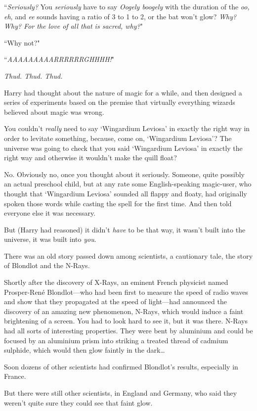 ``\emph{Seriously?} You \emph{seriously} have to say \emph{Oogely boogely} with the duration of the \emph{oo, eh}, and \emph{ee} sounds having a ratio of 3 to 1 to 2, or the bat won't glow? \emph{Why? Why? For the love of all that is sacred, why?}"

``Why not?"

``\emph{AAAAAAAAARRRRRRGHHHH!}"

\emph{Thud. Thud. Thud.}

Harry had thought about the nature of magic for a while, and then designed a series of experiments based on the premise that virtually everything wizards believed about magic was wrong.

You couldn't \emph{really} need to say `Wingardium Leviosa' in exactly the right way in order to levitate something, because, come on, `Wingardium Leviosa'? The universe was going to check that you said `Wingardium Leviosa' in exactly the right way and otherwise it wouldn't make the quill float?

No. Obviously no, once you thought about it seriously. Someone, quite possibly an actual preschool child, but at any rate some English-speaking magic-user, who thought that `Wingardium Leviosa' sounded all flappy and floaty, had originally spoken those words while casting the spell for the first time. And then told everyone else it was necessary.

But (Harry had reasoned) it didn't \emph{have} to be that way, it wasn't built into the universe, it was built into \emph{you}.

There was an old story passed down among scientists, a cautionary tale, the story of Blondlot and the N-Rays.

Shortly after the discovery of X-Rays, an eminent French physicist named Prosper-René Blondlot—who had been first to measure the speed of radio waves and show that they propagated at the speed of light—had announced the discovery of an amazing new phenomenon, N-Rays, which would induce a faint brightening of a screen. You had to look hard to see it, but it was there. N-Rays had all sorts of interesting properties. They were bent by aluminium and could be focused by an aluminium prism into striking a treated thread of cadmium sulphide, which would then glow faintly in the dark{\ldots}

Soon dozens of other scientists had confirmed Blondlot's results, especially in France.

But there were still other scientists, in England and Germany, who said they weren't quite sure they could see that faint glow.

